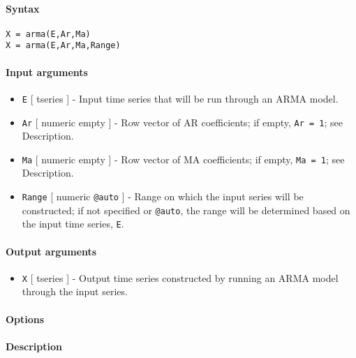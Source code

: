 


	\paragraph{Syntax}

\begin{verbatim}
X = arma(E,Ar,Ma)
X = arma(E,Ar,Ma,Range)
\end{verbatim}

\paragraph{Input arguments}

\begin{itemize}
\item
  \texttt{E} {[} tseries {]} - Input time series that will be run
  through an ARMA model.
\item
  \texttt{Ar} {[} numeric \textbar{} empty {]} - Row vector of AR
  coefficients; if empty, \texttt{Ar = 1}; see Description.
\item
  \texttt{Ma} {[} numeric \textbar{} empty {]} - Row vector of MA
  coefficients; if empty, \texttt{Ma = 1}; see Description.
\item
  \texttt{Range} {[} numeric \textbar{} \texttt{@auto} {]} - Range on
  which the input series will be constructed; if not specified or
  \texttt{@auto}, the range will be determined based on the input time
  series, \texttt{E}.
\end{itemize}

\paragraph{Output arguments}

\begin{itemize}
\itemsep1pt\parskip0pt
\item
  \texttt{X} {[} tseries {]} - Output time series constructed by running
  an ARMA model through the input series.
\end{itemize}

\paragraph{Options}

\paragraph{Description}


